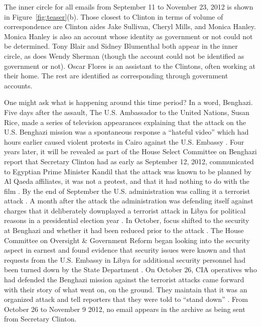 \documentclass[journal]{vgtc}                %
\begin{document}
The inner circle for all emails from September 11 to November 23, 2012 is shown in Figure~\ref{fig:teaser}(b).  Those closest to Clinton in terms of volume of correspondence are Clinton aides Jake Sullivan, Cheryl Mills, and Monica Hanley.  Monica Hanley is also an account whose identity as government or not could not be determined.  Tony Blair and Sidney Blumenthal both appear in the inner circle, as does Wendy Sherman (though the account could not be identified as government or not).  Oscar Flores is an assistant to the Clintons, often working at their home.  The rest are identified as corresponding through government accounts.

One might ask what is happening around this time period?  In a word, Benghazi.  Five days after the assault, The U.S. Ambassador to the United Nations, Susan Rice, made a series of television appearances explaining that the attack on the U.S. Benghazi mission was a spontaneous response a  ``hateful video''  which had hours earlier caused violent protests in Cairo against the U.S. Embassy \cite{faceTheNationSept16}.   Four years later, it will be revealed as part of the House Select Committee on Benghazi report \cite{BenghaziReport} that Secretary Clinton had as early as September 12, 2012, communicated to Egyptian Prime Minister Kandil that the attack was known to be planned by Al Qaeda affiliates, it was not a protest, and that it had nothing to do with the film \cite{ClintonAdmitsAttackSept12}.  By the end of September the U.S. administration was calling it a terrorist attack \cite{factCheckerBenghazi}.  A month after the attack the administration was defending itself against charges that it deliberately downplayed a terrorist attack in Libya for political reasons in a presidential election year \cite{susanRiceWashPost2012}.   In October, focus shifted to the security at Benghazi and whether it had been reduced prior to the attack  \cite{cbsSecurity}.  The House Committee on Oversight \& Government Reform began looking into the security aspect \cite{cbsNewsHouseOversight2012} in earnest and found evidence that security issues were known and that requests from the U.S. Embassy in Libya for additional security personnel had been turned down by the State Department \cite{BenghaziSecurityTestimony}.  On October 26, CIA operatives who had defended the Benghazi mission against the terrorist attacks came forward with their story of what went on, on the ground.  They maintain that it was an organized attack and tell reporters that they were told to ``stand down'' \cite{standDownOrder}.  From October 26 to November 9 2012, no email appears in the archive as being sent from Secretary Clinton.
\end{document}
